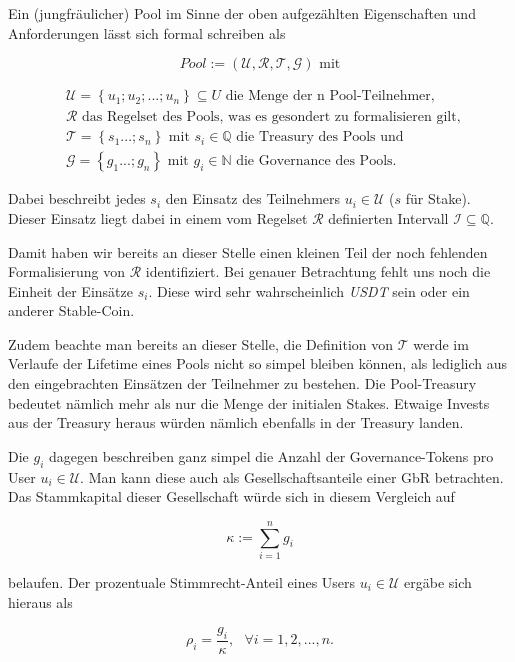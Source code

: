 \begin{Def}\label{defPool}

Ein (jungfräulicher) Pool im Sinne der oben aufgezählten Eigenschaften und Anforderungen lässt sich formal schreiben als

\begin{equation*}
  Pool := \left( \mathcal{U}, \mathcal{R}, \mathcal{T}, \mathcal{G} \right) \text{ mit}
\end{equation*}

\begin{align*}
  & \mathcal{U} = \left\{ u_1; u_2;...;u_n \right\} \subseteq U \text{ die Menge der n Pool-Teilnehmer, } \\
  & \mathcal{R} \text{ das Regelset des Pools, was es gesondert zu formalisieren gilt, } \\
  & \mathcal{T} = \left\{ s_1...;s_n \right\} \text{ mit } s_i \in \mathbb{Q} \text{ die Treasury des Pools und} \\
  & \mathcal{G} = \left\{ g_1...;g_n \right\} \text{ mit } g_i \in \mathbb{N} \text{ die Governance des Pools.}
\end{align*}


\noindent\hrulefill
\vspace{0.2cm}

Dabei beschreibt jedes $s_i$ den Einsatz des Teilnehmers $u_i \in \mathcal{U}$ ($s$ für Stake). Dieser Einsatz liegt dabei in einem vom Regelset $\mathcal{R}$ definierten Intervall $\mathcal{I} \subseteq \mathbb{Q}$. 

Damit haben wir bereits an dieser Stelle einen kleinen Teil der noch fehlenden Formalisierung von $\mathcal{R}$ identifiziert. Bei genauer Betrachtung fehlt uns noch die Einheit der Einsätze $s_i$. Diese wird sehr wahrscheinlich \textit{USDT} sein oder ein anderer Stable-Coin.

Zudem beachte man bereits an dieser Stelle, die Definition von $\mathcal{T}$ werde im Verlaufe der Lifetime eines Pools nicht so simpel bleiben können, als lediglich aus den eingebrachten Einsätzen der Teilnehmer zu bestehen. Die Pool-Treasury bedeutet nämlich mehr als nur die Menge der initialen Stakes. Etwaige Invests aus der Treasury heraus würden nämlich ebenfalls in der Treasury landen.

\vspace{0.2cm} 

Die $g_i$ dagegen beschreiben ganz simpel die Anzahl der Governance-Tokens pro User $u_i \in \mathcal{U}$. Man kann diese auch als Gesellschaftsanteile einer GbR betrachten. Das Stammkapital dieser Gesellschaft würde sich in diesem Vergleich auf

\begin{equation*}
  \kappa := \sum_{i=1}^{n} g_i 
\end{equation*}

belaufen. Der prozentuale Stimmrecht-Anteil eines Users $u_i \in \mathcal{U}$ ergäbe sich hieraus als 

\begin{equation*}
  \rho_i = \frac{g_i}{\kappa}, \text{   } \forall i = 1, 2, ...,n. 
\end{equation*}

\end{Def}

